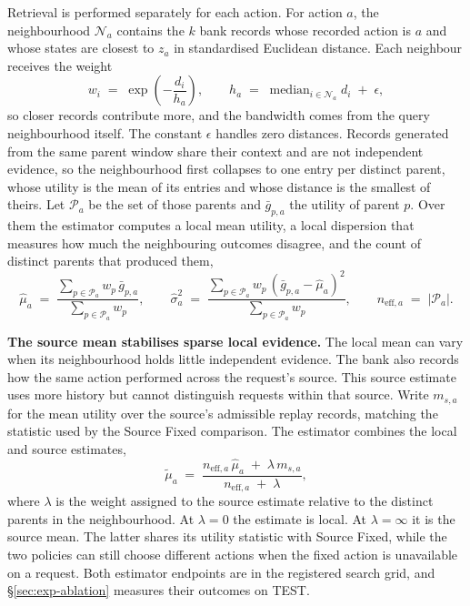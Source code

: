 \documentclass{article}
\newcommand{\calN}{\mathcal{N}}
\newcommand{\calP}{\mathcal{P}}
\begin{document}
Retrieval is performed separately for each action. For action $a$, the neighbourhood
$\calN_a$ contains the $k$ bank records whose recorded action is $a$ and whose states are
closest to $z_a$ in standardised Euclidean distance. Each neighbour receives the weight
\begin{equation}
  w_i \;=\; \exp\!\left(-\frac{d_i}{h_a}\right),
  \qquad
  h_a \;=\; \operatorname{median}_{i \in \calN_a} d_i \;+\; \epsilon ,
  \label{eq:weights}
\end{equation}
so closer records contribute more, and the bandwidth comes from the query neighbourhood
itself. The constant $\epsilon$ handles zero distances. Records generated from the same
parent window share their context and are not independent evidence, so the neighbourhood
first collapses to one entry per distinct parent, whose utility is the mean of its entries and
whose distance is the smallest of theirs. Let $\calP_a$ be the set of those parents and
$\bar g_{p,a}$ the utility of parent $p$. Over them the estimator computes a local mean
utility, a local dispersion that measures how much the neighbouring outcomes disagree, and the
count of distinct parents that produced them,
\begin{equation}
  \hat\mu_a \;=\; \frac{\sum_{p \in \calP_a} w_p\, \bar g_{p,a}}{\sum_{p \in \calP_a} w_p},
  \qquad
  \hat\sigma_a^{2} \;=\; \frac{\sum_{p \in \calP_a} w_p\, (\bar g_{p,a} - \hat\mu_a)^{2}}{\sum_{p \in \calP_a} w_p},
  \qquad
  n_{\mathrm{eff},a} \;=\; \left| \calP_a \right| .
  \label{eq:local-moments}
\end{equation}

\textbf{The source mean stabilises sparse local evidence.} The local mean can vary when its neighbourhood holds little independent evidence. The bank
also records how the same action performed across the request's source. This source estimate
uses more history but cannot distinguish requests within that source. Write $m_{s,a}$ for the
mean utility over the source's admissible replay records, matching the statistic used by the
Source Fixed comparison. The estimator combines the local and source estimates,
\begin{equation}
  \tilde\mu_a \;=\; \frac{n_{\mathrm{eff},a}\,\hat\mu_a \;+\; \lambda\, m_{s,a}}
                          {n_{\mathrm{eff},a} \;+\; \lambda} ,
  \label{eq:pooled}
\end{equation}
where $\lambda$ is the weight assigned to the source estimate relative to the distinct
parents in the neighbourhood. At $\lambda=0$ the estimate is local. At
$\lambda=\infty$ it is the source mean. The latter shares its utility statistic with
Source Fixed, while the two policies can still choose different actions when the fixed
action is unavailable on a request. Both estimator endpoints are in the registered search
grid, and \S\ref{sec:exp-ablation} measures their outcomes on TEST.
\end{document}
